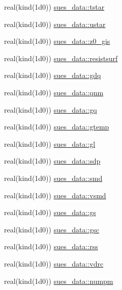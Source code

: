 \begin{DoxyCompactItemize}
real(kind(1d0)) \hyperlink{namespacesues__data_a6d0dd8d535aa36ca406b9c4ba99caef6}{sues\+\_\+data\+::tstar}
\item 
real(kind(1d0)) \hyperlink{namespacesues__data_a3422c30d52ea500ca138d13670403a50}{sues\+\_\+data\+::ustar}
\item 
real(kind(1d0)) \hyperlink{namespacesues__data_a7c7f724d95b99e3b5ff7e350e70f1fb1}{sues\+\_\+data\+::z0\+\_\+gis}
\item 
real(kind(1d0)) \hyperlink{namespacesues__data_a678cac1e19ddb70f811693772c031f0c}{sues\+\_\+data\+::resistsurf}
\item 
real(kind(1d0)) \hyperlink{namespacesues__data_a7ef0beda82e8b6758f37961b50f91b8a}{sues\+\_\+data\+::gdq}
\item 
real(kind(1d0)) \hyperlink{namespacesues__data_aa14586435e8c54f775a51aa1dd21ef28}{sues\+\_\+data\+::qnm}
\item 
real(kind(1d0)) \hyperlink{namespacesues__data_a3ad79feef0770aefcae45775fa0c22c8}{sues\+\_\+data\+::gq}
\item 
real(kind(1d0)) \hyperlink{namespacesues__data_afdcda32590540b1055ac240cd92e9325}{sues\+\_\+data\+::gtemp}
\item 
real(kind(1d0)) \hyperlink{namespacesues__data_a4206a1be622f71796ce77db00ec3d459}{sues\+\_\+data\+::gl}
\item 
real(kind(1d0)) \hyperlink{namespacesues__data_a435acd94af1e3a271f4ee348ac811ad4}{sues\+\_\+data\+::sdp}
\item 
real(kind(1d0)) \hyperlink{namespacesues__data_ac73de7c829233718bfd143f4346adf70}{sues\+\_\+data\+::smd}
\item 
real(kind(1d0)) \hyperlink{namespacesues__data_adfce8b9e1538d8a1629df9963a7a6df0}{sues\+\_\+data\+::vsmd}
\item 
real(kind(1d0)) \hyperlink{namespacesues__data_a5eb7587d26ec3542141102660d22dd33}{sues\+\_\+data\+::gs}
\item 
real(kind(1d0)) \hyperlink{namespacesues__data_a0aca98063df71052382d5ab58c2f0d19}{sues\+\_\+data\+::gsc}
\item 
real(kind(1d0)) \hyperlink{namespacesues__data_ae3375f2161517eabda778cd0642076c5}{sues\+\_\+data\+::rss}
\item 
real(kind(1d0)) \hyperlink{namespacesues__data_a79ee74466d17ed05bb20f195934f383b}{sues\+\_\+data\+::vdrc}
\item 
real(kind(1d0)) \hyperlink{namespacesues__data_a06a4500745768a4bcf4886312a028e0c}{sues\+\_\+data\+::numpm}
\item 

\end{DoxyCompactItemize}
